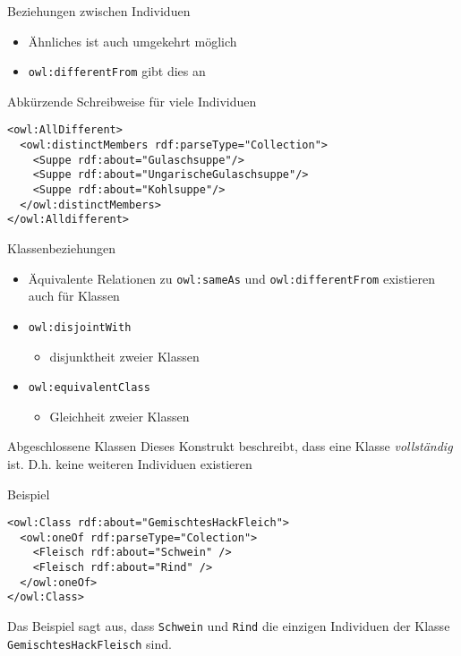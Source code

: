 \documentclass{beamer}
\begin{document}
\begin{frame}[fragile]{Beziehungen zwischen Individuen}
\begin{itemize}
\item Ähnliches ist auch umgekehrt möglich
\item \texttt{owl:differentFrom} gibt dies an
\end{itemize}
\begin{block}{Abkürzende Schreibweise für viele Individuen}
\begin{lstlisting}[lang="xml"]
<owl:AllDifferent>
  <owl:distinctMembers rdf:parseType="Collection">
    <Suppe rdf:about="Gulaschsuppe"/>
    <Suppe rdf:about="UngarischeGulaschsuppe"/>
    <Suppe rdf:about="Kohlsuppe"/>
  </owl:distinctMembers>
</owl:Alldifferent>
\end{lstlisting}
\end{block}

\end{frame}
%
\begin{frame}[fragile]{Klassenbeziehungen}
\begin{itemize}
\item Äquivalente Relationen zu \texttt{owl:sameAs} und \texttt{owl:differentFrom}
existieren auch für Klassen
\item \texttt{owl:disjointWith}
\begin{itemize}
 \item disjunktheit zweier Klassen
\end{itemize}
\item \texttt{owl:equivalentClass}
\begin{itemize}
 \item Gleichheit zweier Klassen
\end{itemize}
\end{itemize}
\end{frame}
%
\begin{frame}[fragile]{Abgeschlossene Klassen}
Dieses Konstrukt beschreibt, dass eine Klasse \emph{vollständig} ist. D.h. keine weiteren Individuen existieren		
\begin{block}{Beispiel}
\begin{lstlisting}[lang="xml"]
<owl:Class rdf:about="GemischtesHackFleich">
  <owl:oneOf rdf:parseType="Colection">
    <Fleisch rdf:about="Schwein" />
    <Fleisch rdf:about="Rind" />
  </owl:oneOf>
</owl:Class>
\end{lstlisting}
\end{block}
Das Beispiel sagt aus, dass \texttt{Schwein} und \texttt{Rind} die einzigen Individuen der Klasse \texttt{GemischtesHackFleisch} sind.
\end{frame}
\end{document}
